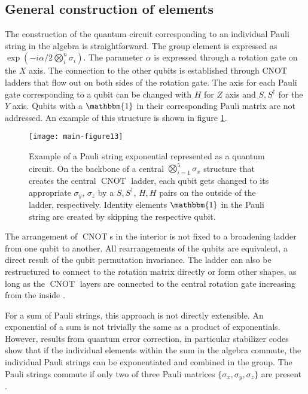 \documentclass[%
 reprint,
 amsmath,amssymb,
 aps,
]{revtex4-2}
\newcommand{\CNOT}{\operatorname{CNOT}}
\theoremstyle{definition}%
\begin{document}
\subsection{General construction of elements}\label{ssec:general-construction}

The construction of the quantum circuit corresponding to an individual Pauli string in the algebra is straightforward. The group element is expressed as $\exp(-i\alpha/2\bigotimes_i^n \sigma_i)$. The parameter $\alpha$ is expressed through a rotation gate on the $X$ axis. The connection to the other qubits is established through CNOT ladders that flow out on both sides of the rotation gate. The axis for each Pauli gate corresponding to a qubit can be changed with $H$ for $Z$ axis and $S, S^\dagger$ for the $Y$ axis. Qubits with a $\mathbbm{1}$ in their corresponding Pauli matrix are not addressed. An example of this structure is shown in figure \ref{fig:zzyz}.

\begin{figure}
    \centering
\texttt{[image: main-figure13]}
    \caption{Example of a Pauli string exponential represented as a quantum circuit. On the backbone of a central $\bigotimes_{i=1}^5 \sigma_x$ structure that creates the central $\CNOT$ ladder, each qubit gets changed to its appropriate $\sigma_y$, $\sigma_z$ by a $S, S^\dagger$, $H, H$ pairs on the outside of the ladder, respectively. Identity elements $\mathbbm{1}$ in the Pauli string are created by skipping the respective qubit.}
    \label{fig:zzyz}
\end{figure}

The arrangement of $\CNOT$s in the interior is not fixed to a broadening ladder from one qubit to another. All rearrangements of the qubits are equivalent, a direct result of the qubit permutation invariance. The ladder can also be restructured to connect to the rotation matrix directly or form other shapes, as long as the $\CNOT$ layers are connected to the central rotation gate increasing from the inside \cite{mansky_decomposition_2023, cowtan_phase_2020}. 



For a sum of Pauli strings, this approach is not directly extensible. An exponential of a sum is not trivially the same as a product of exponentials. However, results from quantum error correction, in particular stabilizer codes \cite{gottesman_stabilizer_1997} show that if the individual elements within the sum in the algebra commute, the individual Pauli strings can be exponentiated and combined in the group. The Pauli strings commute if only two of three Pauli matrices $\{\sigma_x, \sigma_y, \sigma_z\}$ are present \cite{djordjevic_quantum_2022}.
\end{document}
